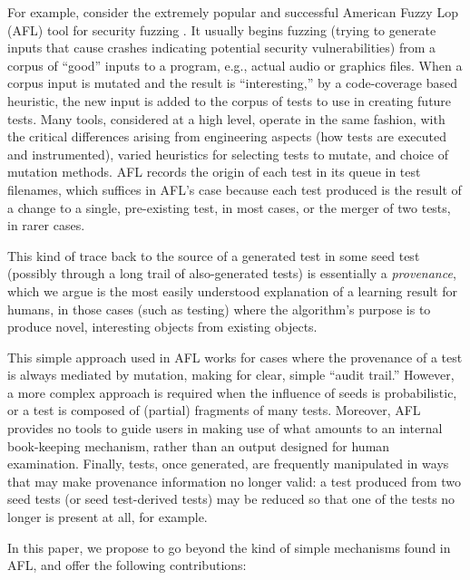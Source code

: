 \documentclass[final]{article}
\begin{document}
For example, consider the extremely popular and successful American
Fuzzy Lop (AFL) tool
for security fuzzing \cite{aflfuzz}.  It usually begins fuzzing
(trying to generate inputs that cause crashes indicating potential
security vulnerabilities) from a corpus of ``good'' inputs to a
program, e.g., actual audio or graphics files.  When a corpus input is mutated and the result is
``interesting,'' by a code-coverage based heuristic, the new input is
added to the corpus of tests to use in creating future tests.  Many
tools, considered at a high level, operate in the same fashion, with the
critical differences arising from engineering aspects (how tests are executed
and instrumented), varied heuristics for selecting tests to mutate,
and choice of mutation methods.  AFL records the origin of each test
in its queue in test filenames, which suffices in AFL's case because
each test produced is the result of a change to a single, pre-existing
test, in most cases, or the merger of two tests, in rarer cases.

This kind of trace back to the source of a generated test in some seed
test (possibly through a long trail of also-generated tests) is
essentially a \emph{provenance}, which we argue is the most easily
understood explanation of a learning result for humans, in those cases
(such as testing) where the algorithm's purpose is to produce
novel, interesting objects from existing objects.

This simple approach used in AFL works for cases where the provenance of a test is
always mediated by mutation, making for clear, simple ``audit trail.''  However, a more complex approach is
required when the influence of seeds is probabilistic, or a test is
composed of (partial) fragments of many tests.  Moreover, AFL provides
no tools to guide users in making use of what amounts to an internal
book-keeping mechanism, rather than an output designed for human
examination.
Finally, tests, once generated, are frequently manipulated in ways
that may make provenance information no longer valid:  a test produced
from two seed tests (or seed test-derived tests) may be reduced
\cite{DD} so that one of the tests no longer is present at all, for example.

In this paper, we propose to go beyond the kind of simple mechanisms
found in AFL, and
offer the following contributions:
\end{document}
